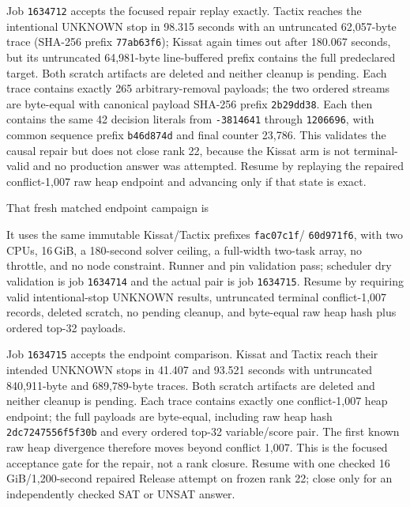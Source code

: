 \documentclass[11pt]{article}
\newcommand{\code}[1]{\texttt{#1}}
\newcommand{\artifact}[1]{\path{#1}}
\begin{document}
Job \code{1634712} accepts the focused repair replay exactly. Tactix reaches
the intentional UNKNOWN stop in 98.315 seconds with an untruncated 62,057-byte
trace (SHA-256 prefix \code{77ab63f6}); Kissat again times out after 180.067
seconds, but its untruncated 64,981-byte line-buffered prefix contains the full
predeclared target. Both scratch artifacts are deleted and neither cleanup is
pending. Each trace contains exactly 265 arbitrary-removal payloads; the two
ordered streams are byte-equal with canonical payload SHA-256 prefix
\code{2b29dd38}. Each then contains the same 42 decision literals from
\code{-3814641} through \code{1206696}, with common sequence prefix
\code{b46d874d} and final counter 23,786. This validates the causal repair but
does not close rank 22, because the Kissat arm is not terminal-valid and no
production answer was attempted. Resume by replaying the repaired
conflict-1,007 raw heap endpoint and advancing only if that state is exact.

That fresh matched endpoint campaign is
\begin{center}\small\artifact{20260819-1453-tierd-rank22-repaired-c1007-endpoint}\end{center}
It uses the same immutable Kissat/Tactix prefixes \code{fac07c1f}/
\code{60d971f6}, with two CPUs, 16\,GiB, a 180-second solver ceiling, a
full-width two-task array, no throttle, and no node constraint. Runner and pin
validation pass; scheduler dry validation is job \code{1634714} and the actual
pair is job \code{1634715}. Resume by requiring valid intentional-stop UNKNOWN
results, untruncated terminal conflict-1,007 records, deleted scratch, no
pending cleanup, and byte-equal raw heap hash plus ordered top-32 payloads.

Job \code{1634715} accepts the endpoint comparison. Kissat and Tactix reach
their intended UNKNOWN stops in 41.407 and 93.521 seconds with untruncated
840,911-byte and 689,789-byte traces. Both scratch artifacts are deleted and
neither cleanup is pending. Each trace contains exactly one conflict-1,007
heap endpoint; the full payloads are byte-equal, including raw heap hash
\code{2dc7247556f5f30b} and every ordered top-32 variable/score pair. The first
known raw heap divergence therefore moves beyond conflict 1,007. This is the
focused acceptance gate for the repair, not a rank closure. Resume with one
checked 16\,GiB/1,200-second repaired Release attempt on frozen rank 22; close
only for an independently checked SAT or UNSAT answer.
\end{document}

